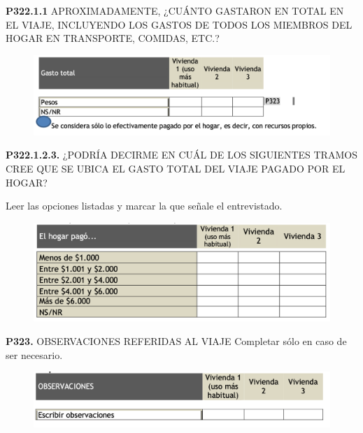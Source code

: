 \documentclass[
  openany]{book}
\begin{document}
\textbf{P322.1.1} APROXIMADAMENTE, ¿CUÁNTO GASTARON EN TOTAL EN EL VIAJE, INCLUYENDO
LOS GASTOS DE TODOS LOS MIEMBROS DEL HOGAR EN TRANSPORTE, COMIDAS, ETC.?

\begin{figure}

{\centering \includegraphics[width=1\linewidth]{imagenes/figura6-171} 

}

\end{figure}

\textbf{P322.1.2.3.} ¿PODRÍA DECIRME EN CUÁL DE LOS SIGUIENTES TRAMOS CREE QUE SE UBICA EL GASTO TOTAL DEL VIAJE PAGADO POR EL HOGAR?

Leer las opciones listadas y marcar la que señale el entrevistado.

\begin{figure}

{\centering \includegraphics[width=1\linewidth]{imagenes/figura6-172} 

}

\end{figure}

\textbf{P323.} OBSERVACIONES REFERIDAS AL VIAJE
Completar sólo en caso de ser necesario.

\begin{figure}

{\centering \includegraphics[width=1\linewidth]{imagenes/figura6-173} 

}

\end{figure}
\end{document}
